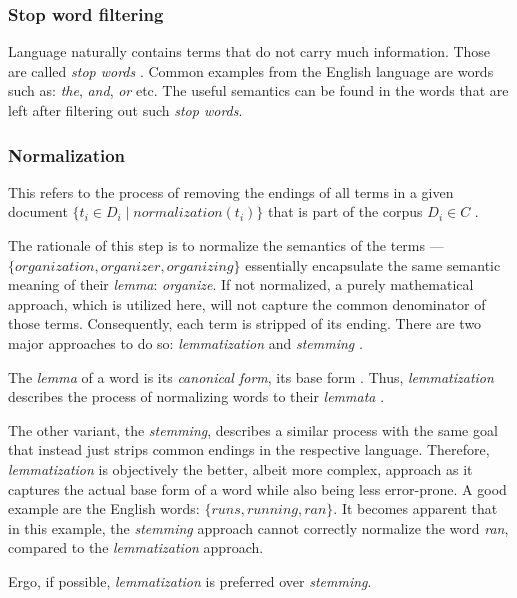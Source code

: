 \documentclass[12pt,a4paper]{report}
\begin{document}
\subsubsection{Stop word filtering}
Language naturally contains terms that do
not carry much information. Those are called \textit{stop words}
\cite{singhal2001ir}. Common examples from the English language are words such as:
\textit{the}, \textit{and}, \textit{or} etc. The useful semantics can be found
in the words that are left after filtering out such \textit{stop words}.


\subsubsection{Normalization}
This refers to the process of
removing the endings of all terms in a given document
\(\{t_i \in D_i \mid normalization(t_i)\}\) that is part of the corpus
\(D_i \in C\) \cite{singhal2001ir}.

The rationale of this step is to normalize the semantics of the terms ---\\
\(\{\textit{organization}, \textit{organizer}, \textit{organizing}\}\) essentially
encapsulate the same semantic meaning of their \textit{lemma}: \textit{organize}.
If not normalized, a purely mathematical approach, which is
utilized here, will not capture the common denominator of those terms.
Consequently, each term is stripped of its ending. There are two major
approaches to do so: \textit{lemmatization} and \textit{stemming}
\cite{plisson2004lemma}.

The \textit{lemma} of a word is its \textit{canonical form}, its base form
\cite{plisson2004lemma}. Thus, \textit{lemmatization} describes the process of
normalizing words to their \textit{lemmata} \cite{plisson2004lemma}.

The other variant, the \textit{stemming}, describes a similar process with the
same goal that instead just strips common endings in the respective language.
Therefore, \textit{lemmatization} is objectively the better, albeit more
complex, approach as it captures the actual base form of a word while also
being less error-prone. A good example are the English words:
\(\{\textit{runs}, \textit{running}, \textit{ran}\}\).
It becomes apparent that in this example, the \textit{stemming} approach
cannot correctly normalize the word \textit{ran}, compared to the
\textit{lemmatization} approach.

Ergo, if possible, \textit{lemmatization} is preferred over \textit{stemming}.
\end{document}
